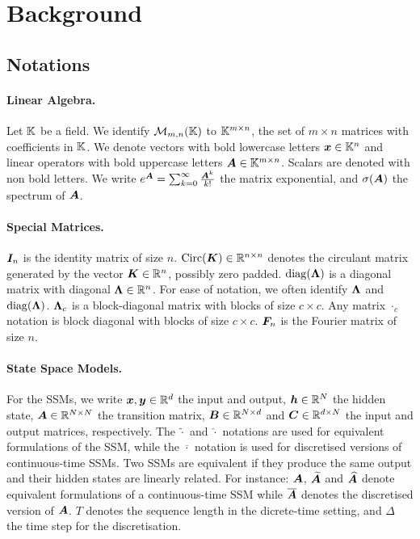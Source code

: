 \documentclass{article}
\newcommand{\greg}[1]{\par\noindent{\color{indigo}[Gregoire]: #1}\par}
\newcommand{\TS}[1]{\par\noindent{\color{red}[TS]: #1}\par}
\begin{document}
\section{Background}
\subsection{Notations}
\paragraph{Linear Algebra.} Let $\mathbb{K}$ be a field. We identify $\mathcal{M}_{m,n}(\mathbb{K})$ to $\mathbb{K}^{m \times n}$, the set of $m \!\times\! n$ matrices with coefficients in $\mathbb{K}$. We denote vectors with bold lowercase letters $\bm{x} \in \mathbb{K}^n$ and linear operators with bold uppercase letters $\bm{A} \in \mathbb{K}^{m \times n}$. Scalars are denoted with non bold letters. We write $e^{\bm{A}} = \sum_{k=0}^{\infty} \frac{\bm{A}^k}{k!}$ the matrix exponential, and $\sigma(\bm{A})$ the spectrum of $\bm{A}$.
\paragraph{Special Matrices.} $\bm{I}_n$ is the identity matrix of size $n$. $\mathrm{Circ}(\bm{K}) \in \mathbb{R}^{n \times n}$ denotes the circulant matrix generated by the vector $\bm{K} \in \mathbb{R}^n$, possibly zero padded. $\mathrm{diag}(\bm{\Lambda})$ is a diagonal matrix with diagonal $\bm{\Lambda} \in \mathbb{R}^n$. For ease of notation, we often identify $\bm{\Lambda}$ and $\mathrm{diag}(\bm{\Lambda})$. $\bm{\Lambda}_c$ is a block-diagonal matrix with blocks of size $c \!\times\! c$. Any matrix $\cdot_c$ notation is block diagonal with blocks of size $c \!\times\! c$. $\bm{F}_n$ is the Fourier matrix of size $n$.
\paragraph{State Space Models.} For the SSMs, we write $\bm{x}, \bm{y} \in \mathbb{R}^{d}$ the input and output, $\bm{h} \in \mathbb{R}^{N}$ the hidden state, $\bm{A} \in \mathbb{R}^{{N}\times {N}}$ the transition matrix, $\bm{B} \in \mathbb{R}^{N \times d}$ and $\bm{C} \in \mathbb{R}^{d \times N}$ the input and output matrices, respectively. The $\widetilde{\cdot}$ and $\widehat{\cdot}$ notations are used for equivalent formulations of the SSM, while the $\overline{\cdot}$ notation is used for discretised versions of continuous-time SSMs. Two SSMs are equivalent if they produce the same output and their hidden states are linearly related. For instance: $\bm{A}$, $\widetilde{\bm{A}}$ and $\widehat{\bm{A}}$ denote equivalent formulations of a continuous-time SSM while $\overline{\bm{A}}$ denotes the discretised version of $\bm{A}$. $T$ denotes the sequence length in the dicrete-time setting, and $\Delta$ the time step for the discretisation.
\end{document}
